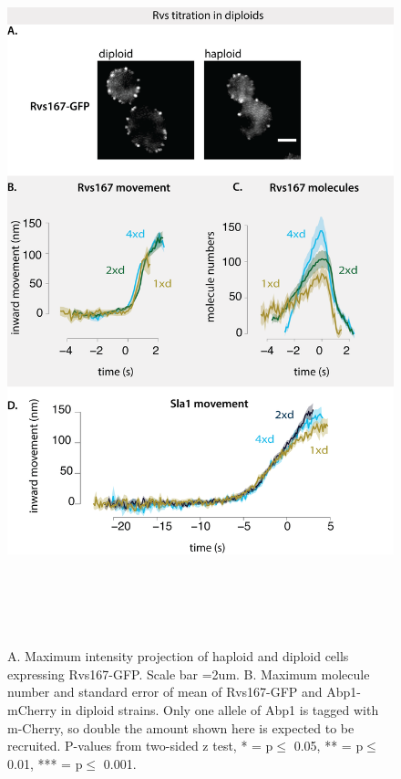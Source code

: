 
	\vspace{5mm}




\vspace{2mm}
						\begin{figure}[H]
	\centering
\includegraphics[width=21cm,height=21cm,keepaspectratio]{figures/results_final/protein_friction7}
	\vspace*{2mm}
	\caption[Molecule numbers in diploid cells]
	{A. Maximum intensity projection of haploid and diploid cells expressing Rvs167-GFP. Scale bar =2um.      
		B. Maximum molecule number and standard error of mean of Rvs167-GFP and Abp1-mCherry in diploid strains. Only one allele of Abp1 is tagged with m-Cherry, so double the amount shown here is expected to be recruited. P-values from two-sided z test,  * = p$\leq$ 0.05, ** = p$\leq$ 0.01, *** = p$\leq$ 0.001. 
		\label{fig_rvsdiploid1}}
\end{figure}








